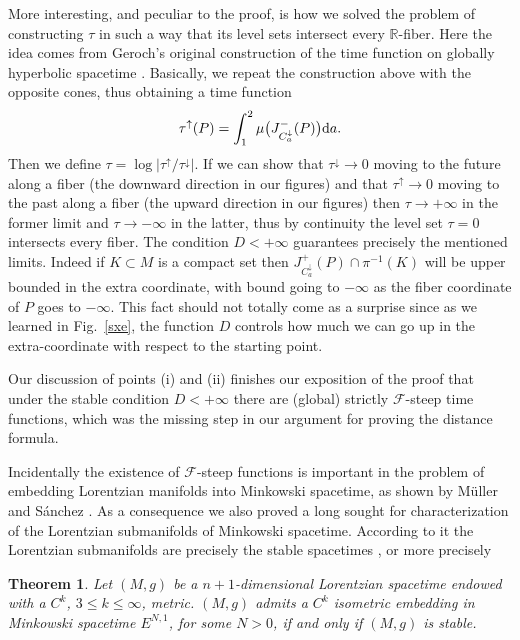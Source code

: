 \documentclass[a4paper]{jpconf}
\newtheorem{theorem}{Theorem}[section]
\theoremstyle{definition}
\theoremstyle{remark}
\newcommand{\dd}{{\rm d}}
\begin{document}
More interesting, and peculiar to the proof, is how we solved the problem of constructing $\tau$ in such a way that its level sets intersect every $\mathbb{R}$-fiber. Here the idea comes from Geroch's original construction of the time function on globally hyperbolic spacetime \cite{hawking73}. Basically, we repeat the construction above  with the opposite cones, thus obtaining a time function
\[
\tau^\uparrow(P)=\int_1^2 \mu\big(J_{C^\downarrow_a}^-(P)\big) \dd a .
\]
Then we define $\tau=\log \vert{\tau^\uparrow}/{\tau^\downarrow} \vert$. If we can show that $\tau^\downarrow\to 0$ moving to the future along a fiber (the downward direction in our figures) and that $\tau^\uparrow \to 0$  moving to the past along a fiber (the upward direction in our figures) then $\tau \to +\infty$ in the former limit and $\tau \to -\infty$ in the latter, thus by continuity the level set $\tau=0$ intersects every fiber. The condition $D<+\infty$ guarantees precisely the mentioned limits. Indeed if $K\subset M$ is a compact set then $J_{C^\downarrow_a}^+(P)\cap \pi^{-1}(K)$ will be upper bounded in the extra coordinate, with bound going to $-\infty$ as the fiber coordinate of $P$ goes to $-\infty$. This fact should not totally come as a surprise since as we learned in Fig.\ \ref{sxe}, the function $D$ controls how much we can go up in the extra-coordinate with respect to the starting point.


Our discussion of points (i) and (ii) finishes our exposition of the proof that under the stable condition $D<+\infty$ there are (global) strictly $\mathscr{F}$-steep time functions, which was the missing step in our argument for proving the distance formula.

Incidentally the existence of  $\mathscr{F}$-steep functions is important in the  problem of embedding Lorentzian manifolds into Minkowski spacetime, as shown by M\"uller and S\'anchez \cite{muller11}. As a consequence we also proved a long sought for characterization of the Lorentzian submanifolds of Minkowski spacetime. According to it the Lorentzian submanifolds are precisely the stable spacetimes \cite{minguzzi17}, or more precisely

\begin{theorem}
Let $(M,g)$ be a $n+1$-dimensional Lorentzian spacetime  endowed with a $C^{k}$, $3\le k\le \infty$, metric. $(M,g)$ admits a $C^k$ isometric embedding in Minkowski spacetime $E^{N,1}$, for some $N>0$, if and only if $(M,g)$ is stable.
\end{theorem}
\end{document}
